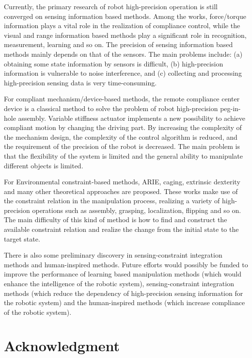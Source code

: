\documentclass[journal,twoside,web]{ieeecolor}
\begin{document}
Currently, the primary research of robot high-precision operation is still converged on sensing information based methods. 
Among the works, force/torque information plays a vital role in the realization of compliance control, while the visual and range information based methods play a significant role in recognition, measurement, learning and so on. 
The precision of sensing information based methods mainly depends on that of the sensors. 
The main problems include: 
(a) obtaining some state information by sensors is difficult, 
(b) high-precision information is vulnerable to noise interference, and  
(c) collecting and processing high-precision sensing data is very time-consuming.

For compliant mechanism/device-based methods, 
the remote compliance center device is a classical method to solve the problem of robot high-precision peg-in-hole assembly. 
Variable stiffness actuator implements a new possibility to achieve compliant motion by changing the driving part.
By increasing the complexity of the mechanism design, the complexity of the control algorithm is reduced, and the requirement of the precision of the robot is decreased. 
The main problem is that the flexibility of the system is limited and the general ability to manipulate different objects is limited.

For Environmental constraint-based methods, ARIE, caging, extrinsic dexterity and many other theoretical approaches are proposed.
These works make use of the constraint relation in the manipulation process, realizing a variety of high-precision operations such as assembly, grasping, localization, flipping and so on. 
The main difficulty of this kind of method is how to find and construct the available constraint relation and realize the change from the initial state to the target state.

There is also some preliminary discovery in sensing-constraint integration methods and human-inspired methods.
Future efforts would possibly be funded to improve the performance of learning based manipulation methods (which would enhance the intelligence of the robotic system), sensing-constraint integration methods (which reduce the dependency of high-precision sensing information for the robotic system) and the human-inspired methods (which increase compliance of the robotic system).

\appendices

\section*{Acknowledgment}
\end{document}
